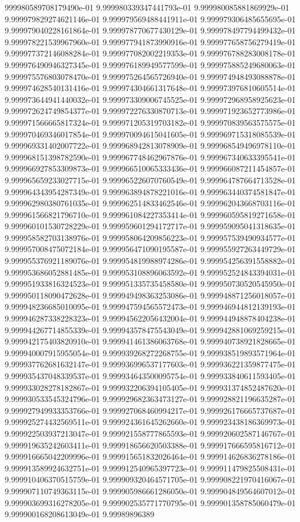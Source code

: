 999980589708179490e-01	9.999980339347441793e-01	9.999980085881869929e-01	9.999979829274621146e-01	9.999979569488441911e-01	9.999979306485655695e-01	9.999979040228161864e-01	9.999978770677430129e-01	9.999978497794499432e-01	9.999978221539967960e-01	9.999977941873990916e-01	9.999977658756279419e-01	9.999977372146088284e-01	9.999977082002219353e-01	9.999976788283008178e-01	9.999976490946327345e-01	9.999976189949577599e-01	9.999975885249680063e-01	9.999975576803078470e-01	9.999975264565726940e-01	9.999974948493088878e-01	9.999974628540131416e-01	9.999974304661317648e-01	9.999973976810605514e-01	9.999973644941440032e-01	9.999973309006745525e-01	9.999972968958925623e-01	9.999972624749854377e-01	9.999972276330870713e-01	9.999971923652773986e-01	9.999971566665817324e-01	9.999971205319703182e-01	9.999970839563575575e-01	9.999970469346017854e-01	9.999970094615041605e-01	9.999969715318085539e-01	9.999969331402007722e-01	9.999968942813078909e-01	9.999968549496978110e-01	9.999968151398782590e-01	9.999967748462967876e-01	9.999967340633395541e-01	9.999966927853309873e-01	9.999966510065333436e-01	9.999966087211454857e-01	9.999965659233027715e-01	9.999965226070760549e-01	9.999964787664713528e-01	9.999964343954287349e-01	9.999963894878221016e-01	9.999963440374581847e-01	9.999962980380761035e-01	9.999962514833462546e-01	9.999962043668703116e-01	9.999961566821796710e-01	9.999961084227353414e-01	9.999960595819271658e-01	9.999960101530728229e-01	9.999959601294172717e-01	9.999959095041318635e-01	9.999958582703138976e-01	9.999958064209856223e-01	9.999957539490934577e-01	9.999957008475072184e-01	9.999956471090195587e-01	9.999955927263449729e-01	9.999955376921189076e-01	9.999954819988974286e-01	9.999954256391558882e-01	9.999953686052881485e-01	9.999953108896063592e-01	9.999952524843394031e-01	9.999951933816324523e-01	9.999951335735458580e-01	9.999950730520545950e-01	9.999950118090472628e-01	9.999949498363253086e-01	9.999948871256018057e-01	9.999948236685010095e-01	9.999947594565572473e-01	9.999946944812139193e-01	9.999946287338228323e-01	9.999945622056432004e-01	9.999944948878404238e-01	9.999944267714855339e-01	9.999943578475543049e-01	9.999942881069259215e-01	9.999942175403820910e-01	9.999941461386063768e-01	9.999940738921828665e-01	9.999940007915955054e-01	9.999939268272268755e-01	9.999938519893571964e-01	9.999937762681632147e-01	9.999936996537177603e-01	9.999936221359877475e-01	9.999935437048339537e-01	9.999934643500095754e-01	9.999933840611593405e-01	9.999933028278182867e-01	9.999932206394105405e-01	9.999931374852487620e-01	9.999930533545324796e-01	9.999929682363473127e-01	9.999928821196635287e-01	9.999927949933353766e-01	9.999927068460994217e-01	9.999926176665737687e-01	9.999925274432569511e-01	9.999924361645262660e-01	9.999923438186369973e-01	9.999922503937213047e-01	9.999921558777865593e-01	9.999920602587146767e-01	9.999919635242603411e-01	9.999918656620503388e-01	9.999917666595816712e-01	9.999916665042209996e-01	9.999915651832026464e-01	9.999914626836278186e-01	9.999913589924632751e-01	9.999912540965397723e-01	9.999911479825508431e-01	9.999910406370515759e-01	9.999909320464571705e-01	9.999908221970416067e-01	9.999907110749363115e-01	9.999905986661286050e-01	9.999904849564607012e-01	9.999903699316278205e-01	9.999902535771770795e-01	9.999901358785060479e-01	9.999900168208613049e-01	9.99989896389